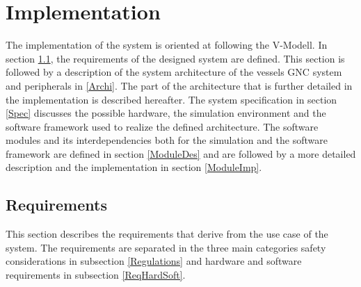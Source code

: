 \chapter{Implementation} \label{Impl}
The implementation of the system is oriented at following the V-Modell. In section \ref{Require}, the requirements of the designed system are defined. This section is followed by a description of the system architecture of the vessels \ac{GNC} system and peripherals in \ref{Archi}. The part of the architecture that is further detailed in the implementation is described hereafter. The system specification in section \ref{Spec} discusses the possible hardware, the simulation environment and the software framework used to realize the defined architecture. The software modules and its interdependencies both for the simulation and the software framework are defined in section \ref{ModuleDes} and are followed by a more detailed description and the implementation in section \ref{ModuleImp}. 

\section{Requirements}\label{Require}
 This section describes the requirements that derive from the use case of the system. The requirements are separated in the three main categories safety considerations in subsection \ref{Regulations} and hardware and software requirements in subsection \ref{ReqHardSoft}.
